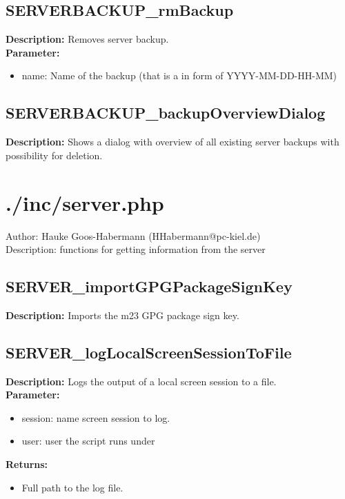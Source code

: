 \subsection{SERVERBACKUP\_rmBackup}
\textbf{Description:} Removes server backup.\\
\textbf{Parameter:}
\begin{itemize}
\item name: Name of the backup (that is a in form of YYYY-MM-DD-HH-MM)
\end{itemize}

\subsection{SERVERBACKUP\_backupOverviewDialog}
\textbf{Description:} Shows a dialog with overview of all existing server backups with possibility for deletion.\\

\newpage\section{./inc/server.php}
 Author: Hauke Goos-Habermann (HHabermann@pc-kiel.de)\\
 Description: functions for getting information from the server\\

\subsection{SERVER\_importGPGPackageSignKey}
\textbf{Description:} Imports the m23 GPG package sign key.\\

\subsection{SERVER\_logLocalScreenSessionToFile}
\textbf{Description:} Logs the output of a local screen session to a file.\\
\textbf{Parameter:}
\begin{itemize}
\item session: name screen session to log.
\item user: user the script runs under
\end{itemize}
\textbf{Returns:}
\begin{itemize}
\item Full path to the log file.
\end{itemize}

